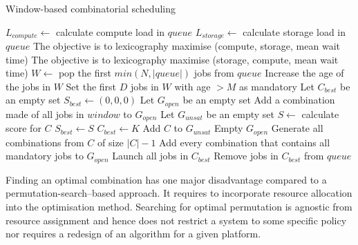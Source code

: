 \documentclass[thesis-en.tex]{subfiles}
\begin{document}
\begin{algorithm}[p]
\caption{Window-based combinatorial scheduling}
\label{alg:window}
\begin{algorithmic}[1]
  \Statex
  \Statex
  \Statex
  \State $L_{compute} \gets$ calculate compute load in $queue$
  \State $L_{storage} \gets$ calculate storage load in $queue$
    \State The objective is to lexicography maximise (compute, storage, mean wait time)
  \Else
    \State The objective is to lexicography maximise (storage, compute, mean wait time)
  \EndIf
  \Statex
  \State $W \gets$ pop the first $min(N, |queue|)$  jobs from $queue$
  \State Increase the age of the jobs in $W$
  \State Set the first $D$ jobs in $W$ with age $> M$ as mandatory
  \Statex
  \State Let $C_{best}$ be an empty set
  \State $S_{best} \gets (0,0,0)$
  \State Let $G_{open}$ be an empty set
  \State Add a combination made of all jobs in $window$ to $G_{open}$
   \label{alg:window:while}
    \State Let $G_{unsat}$ be an empty set
     \label{alg:window:for}
        \State $S \gets$ calculate score for $C$
          \State $S_{best} \gets S$
          \State $C_{best} \gets K$
        \EndIf
      \Else
        \State Add $C$ to $G_{unsat}$
      \EndIf
    \EndFor
    \State Empty $G_{open}$
      \State Generate all combinations from $C$ of size $|C| - 1$
      \State Add every combination that contains all mandatory jobs to $G_{open}$
    \EndFor
  \EndWhile
  \Statex
    \State {}
  \Else
    \State Launch all jobs in $C_{best}$
    \State Remove jobs in $C_{best}$ from $queue$
    \State {}
  \EndIf
\EndProcedure
\end{algorithmic}
\end{algorithm}

Finding an optimal combination has one major disadvantage compared to a permutation-search--based approach. It requires to incorporate resource allocation into the optimisation method. Searching for optimal permutation is agnostic from resource assignment and hence does not restrict a system to some specific policy nor requires a redesign of an algorithm for a given platform.
\end{document}
